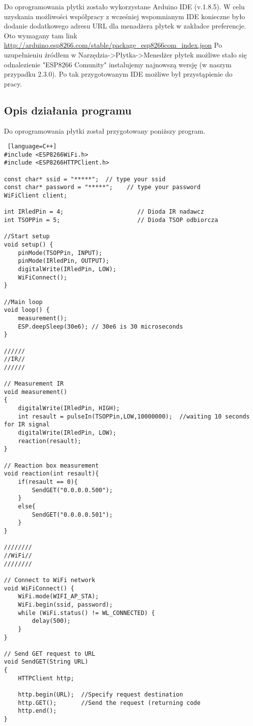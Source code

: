 Do oprogramowania płytki zostało wykorzystane Arduino IDE (v.1.8.5). W celu uzyskania możliwości współpracy z wcześniej wspomnianym IDE konieczne było dodanie dodatkowego adresu URL dla menadżera płytek w zakładce preferencje. Oto wymagany tam link \url{http://arduino.esp8266.com/stable/package_esp8266com_index.json}
Po uzupełnieniu źródłem w Narzędzia->Płytka->Menedżer płytek możliwe stało się odnalezienie "ESP8266 Comunity" instalujemy najnowszą wersję (w naszym przypadku 2.3.0). Po tak przygotowanym IDE możliwe był przystąpienie do pracy.

\subsection{Opis działania programu}

Do oprogramowania płytki został przygotowany poniższy program.

\begin{lstlisting} [language=C++]
#include <ESP8266WiFi.h>
#include <ESP8266HTTPClient.h>

const char* ssid = "*****";  // type your ssid
const char* password = "*****";    // type your password
WiFiClient client;

int IRledPin = 4;                     // Dioda IR nadawcz
int TSOPPin = 5;                      // Dioda TSOP odbiorcza

//Start setup
void setup() {
	pinMode(TSOPPin, INPUT);
	pinMode(IRledPin, OUTPUT);
	digitalWrite(IRledPin, LOW);
	WiFiConnect();
}

//Main loop
void loop() {
	measurement();
	ESP.deepSleep(30e6); // 30e6 is 30 microseconds
}

//////
//IR//
//////

// Measurement IR
void measurement()
{
	digitalWrite(IRledPin, HIGH);
	int resault = pulseIn(TSOPPin,LOW,10000000);  //waiting 10 seconds for IR signal
	digitalWrite(IRledPin, LOW);
	reaction(resault);
}

// Reaction box measurement
void reaction(int resault){
	if(resault == 0){
		SendGET("0.0.0.0.500");
	}
	else{
		SendGET("0.0.0.0.501");
	}
}

////////
//WiFi//
////////

// Connect to WiFi network
void WiFiConnect() {
	WiFi.mode(WIFI_AP_STA);
	WiFi.begin(ssid, password);
	while (WiFi.status() != WL_CONNECTED) {
		delay(500);
	}
}

// Send GET request to URL
void SendGET(String URL)
{
	HTTPClient http;
	
	http.begin(URL);  //Specify request destination
	http.GET();       //Send the request (returning code 
	http.end();
}
\end{lstlisting}

